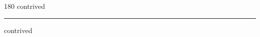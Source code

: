 
\begin{frame}
\begin{center}
\begin{turn}{180}
{\fontsize{2.5cm}{1em}\selectfont contrived}
\end{turn}
\vspace{1em}\par  
\hrule
\vspace{1em}\par  
{\fontsize{2.5cm}{1em}\selectfont contrived}
\end{center}
\end{frame}
